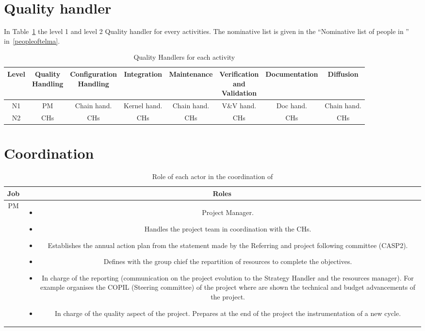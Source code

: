 \section{Quality handler}

In Table~\ref{aqTable} the level 1 and level 2 Quality handler for every
\telemacsystem{} activities. The nominative list is given in the ``Nominative
list of people in \telemacsystem'' in~\ref{peopleoftelma}.

\begin{table}[H]
\begin{tabular}{*{8}{c}}
\toprule
Level & \minibox{Quality\\Handling} & \minibox{Configuration\\Handling} & Integration & Maintenance & \minibox[c]{Verification\\and\\Validation} & Documentation & Diffusion\\
\midrule
N1 & PM  & Chain hand. & Kernel hand. & Chain hand. & V\&V hand. & Doc hand. & Chain hand.\\
N2 & CHs & CHs         & CHs          & CHs         & CHs        & CHs       & CHs        \\
\bottomrule
\end{tabular}
\caption{\label{aqTable}Quality Handlers for each activity}
\end{table}

\section{Coordination}

\begin{table}[H]
\begin{tabular}{cc}
\toprule
Job & Roles \\
\midrule
PM &
\begin{minipage}[l]{14cm}
\begin{itemize}
\itemsep-5pt
\item Project Manager.
\item Handles the project team in coordination with the CHs.
\item Establishes the annual action plan from the statement made by the
  Referring and project following committee (CASP2).
\item Defines with the group chief the repartition of resources to complete the
  objectives.
\item In charge of the reporting (communication on the project evolution to the
  Strategy Handler and the resources manager). For example organises the COPIL
  (Steering committee) of the project where are shown the technical and budget
  advancements of the project.
\item In charge of the quality aspect of the project. Prepares at the end of
  the project the instrumentation of a new cycle.
\end{itemize}
\end{minipage}\\
\bottomrule
\end{tabular}
\caption{\label{coord} Role of each actor in the coordination of \telemacsystem}
\end{table}


